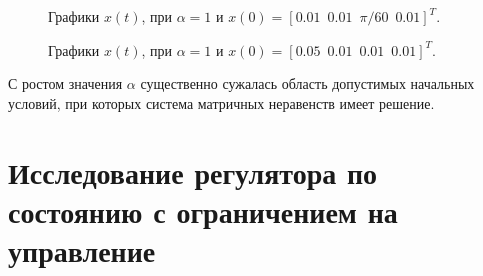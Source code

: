 \begin{figure}[!h]
\caption{Графики $x(t)$, при $\alpha = 1$ и $x(0) = [0.01\, \, \,  0.01\, \, \, \pi / 60\, \, \, 0.01]^T$.}
\label{4_3_1_3}
\end{figure}


\begin{figure}[!h]
\caption{Графики $x(t)$, при $\alpha = 1$ и $x(0) = [0.05\, \, \,  0.01\, \, \, 0.01\, \, \, 0.01]^T$.}
\label{4_3_1_4}
\end{figure}

\newpage
С ростом значения $\alpha$ существенно сужалась область допустимых начальных условий, при которых система матричных неравенств имеет решение.

\section{Исследование регулятора по состоянию с ограничением на управление}

